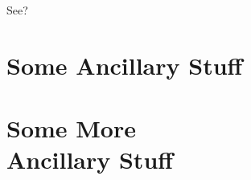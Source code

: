 \documentclass[12pt]{article}
\begin{document}
See?

\appendix

\section{Some Ancillary Stuff}


\section{Some More\\Ancillary Stuff}



\ssp                           %
\nocite{*}
\end{document}
